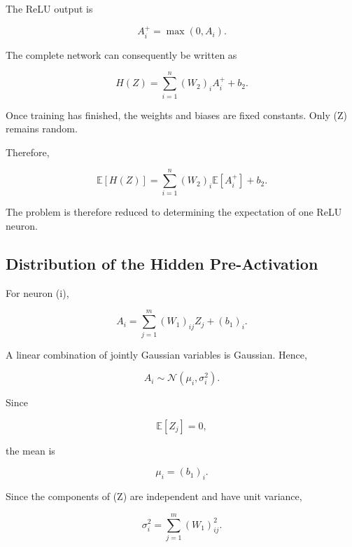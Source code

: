 \documentclass[12pt,a4paper]{report}
\begin{document}
The ReLU output is

\begin{equation}
A_i^+
=
\max(0,A_i).
\end{equation}

The complete network can consequently be written as

\begin{equation}
H(Z)
=
\sum_{i=1}^{n}
(W_2)_iA_i^+
+
b_2.
\end{equation}

Once training has finished, the weights and biases are fixed constants. Only (Z) remains random.

Therefore,

\begin{equation}
\mathbb{E}[H(Z)]
=
\sum_{i=1}^{n}
(W_2)_i
\mathbb{E}[A_i^+]
+
b_2.
\end{equation}

The problem is therefore reduced to determining the expectation of one ReLU neuron.

\subsection{Distribution of the Hidden Pre-Activation}

For neuron (i),

\begin{equation}
A_i
=
\sum_{j=1}^{m}
(W_1)_{ij}Z_j
+
(b_1)_i.
\end{equation}

A linear combination of jointly Gaussian variables is Gaussian. Hence,

\begin{equation}
A_i
\sim
\mathcal{N}
(\mu_i,\sigma_i^2).
\end{equation}

Since

\begin{equation}
\mathbb{E}[Z_j]
=
0,
\end{equation}

the mean is

\begin{equation}
\mu_i
=
(b_1)_i.
\end{equation}

Since the components of (Z) are independent and have unit variance,

\begin{equation}
\sigma_i^2
=
\sum_{j=1}^{m}
(W_1)_{ij}^{2}.
\end{equation}
\end{document}
